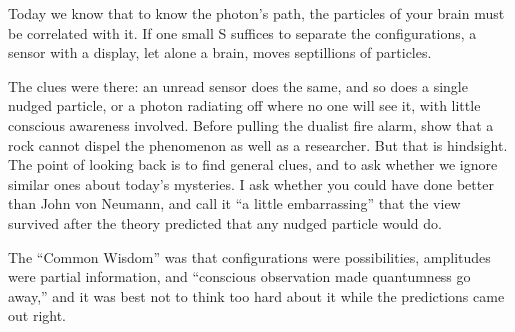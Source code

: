 Today we know that to know the photon's path, the particles of your brain must be correlated with it. If one small S suffices to separate the configurations, a sensor with a display, let alone a brain, moves septillions of particles.

The clues were there: an unread sensor does the same, and so does a single nudged particle, or a photon radiating off where no one will see it, with little conscious awareness involved. Before pulling the dualist fire alarm, show that a rock cannot dispel the phenomenon as well as a researcher. But that is hindsight. The point of looking back is to find general clues, and to ask whether we ignore similar ones about today's mysteries. I ask whether you could have done better than John von Neumann, and call it ``a little embarrassing'' that the view survived after the theory predicted that any nudged particle would do. 

The ``Common Wisdom'' was that configurations were possibilities, amplitudes were partial information, and ``conscious observation made quantumness go away,'' and it was best not to think too hard about it while the predictions came out right. 
